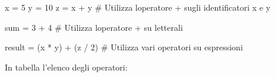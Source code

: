 \documentclass[
  letterpaper,
]{scrbook}
\newenvironment{Shaded}{\begin{snugshade}}{\end{snugshade}}
\newcommand{\BuiltInTok}[1]{\textcolor[rgb]{0.00,0.23,0.31}{#1}}
\newcommand{\CommentTok}[1]{\textcolor[rgb]{0.37,0.37,0.37}{#1}}
\newcommand{\DecValTok}[1]{\textcolor[rgb]{0.68,0.00,0.00}{#1}}
\newcommand{\NormalTok}[1]{\textcolor[rgb]{0.00,0.23,0.31}{#1}}
\newcommand{\OperatorTok}[1]{\textcolor[rgb]{0.37,0.37,0.37}{#1}}
\begin{document}
\begin{Shaded}
\begin{Highlighting}[]
\NormalTok{x }\OperatorTok{=} \DecValTok{5}
\NormalTok{y }\OperatorTok{=} \DecValTok{10}
\NormalTok{z }\OperatorTok{=}\NormalTok{ x }\OperatorTok{+}\NormalTok{ y }\CommentTok{\# Utilizza l\textquotesingle{}operatore + sugli identificatori x e y}

\BuiltInTok{sum} \OperatorTok{=} \DecValTok{3} \OperatorTok{+} \DecValTok{4} \CommentTok{\# Utilizza l\textquotesingle{}operatore + su letterali}

\NormalTok{result }\OperatorTok{=}\NormalTok{ (x }\OperatorTok{*}\NormalTok{ y) }\OperatorTok{+}\NormalTok{ (z }\OperatorTok{/} \DecValTok{2}\NormalTok{) }\CommentTok{\# Utilizza vari operatori su espressioni}
\end{Highlighting}
\end{Shaded}

In tabella l'elenco degli operatori:
\end{document}
